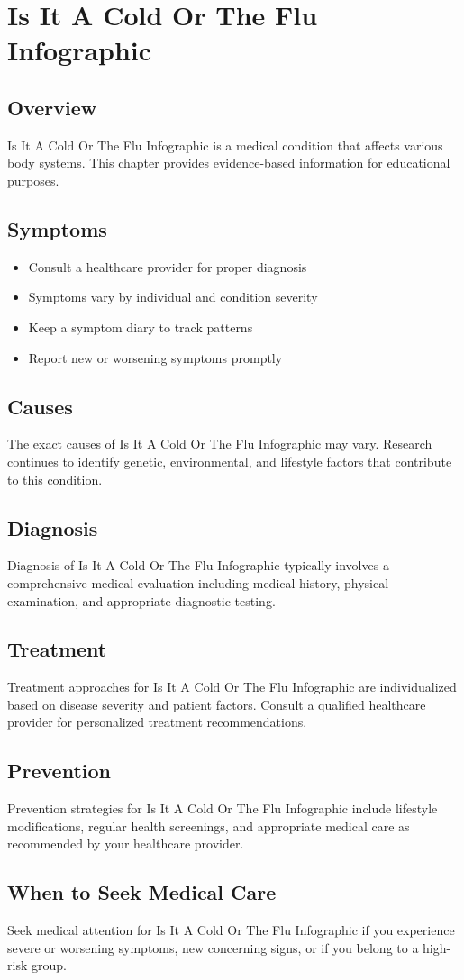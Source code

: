 \chapter{Is It A Cold Or The Flu Infographic}

\section*{Overview}
Is It A Cold Or The Flu Infographic is a medical condition that affects various body systems. This chapter provides evidence-based information for educational purposes.

\section*{Symptoms}
\begin{itemize}
  \item Consult a healthcare provider for proper diagnosis
  \item Symptoms vary by individual and condition severity
  \item Keep a symptom diary to track patterns
  \item Report new or worsening symptoms promptly
\end{itemize}

\section*{Causes}
The exact causes of Is It A Cold Or The Flu Infographic may vary. Research continues to identify genetic, environmental, and lifestyle factors that contribute to this condition.

\section*{Diagnosis}
Diagnosis of Is It A Cold Or The Flu Infographic typically involves a comprehensive medical evaluation including medical history, physical examination, and appropriate diagnostic testing.

\section*{Treatment}
Treatment approaches for Is It A Cold Or The Flu Infographic are individualized based on disease severity and patient factors. Consult a qualified healthcare provider for personalized treatment recommendations.

\section*{Prevention}
Prevention strategies for Is It A Cold Or The Flu Infographic include lifestyle modifications, regular health screenings, and appropriate medical care as recommended by your healthcare provider.

\section*{When to Seek Medical Care}
Seek medical attention for Is It A Cold Or The Flu Infographic if you experience severe or worsening symptoms, new concerning signs, or if you belong to a high-risk group.
\clearpage
